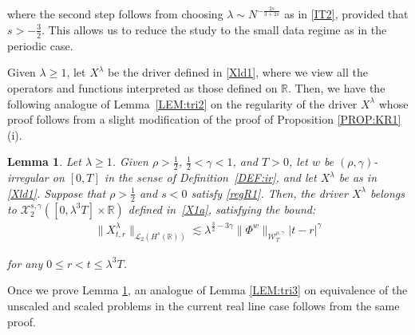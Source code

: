 \documentclass[letterpaper, 11pt,  reqno]{amsart}
\newtheorem{lemma}[theorem]{Lemma}
\newcommand{\1}{\hspace{0.5mm}\text{I}\hspace{0.5mm}}
\newcommand{\noi}{\noindent}
\newcommand{\R}{\mathbb{R}}
\newcommand{\g}{\gamma}
\newcommand{\ld}{\lambda}
\newcommand{\les}{\lesssim}
\newcommand{\cL}{\mathcal{L}}
\newcommand{\cX}{\mathcal{X}}
\newcommand{\W}{\mathcal{W}}
\numberwithin{equation}{section}
\numberwithin{theorem}{section}
\begin{document}
\noi
where the second step 
follows from choosing 
$\ld \sim N^{-\frac{2s}{3+2s}}$ as in \eqref{IT2}, 
provided that $s > -\frac 32$.
This allows us to reduce the study to the small data regime
as in the periodic case.




Given $\ld \ge 1$, let $X^\ld$ be the driver defined in \eqref{Xld1}, 
where we view all the operators and functions 
interpreted as those defined on $\R$.
Then, we have the following 
analogue of Lemma~\ref{LEM:tri2}
on the regularity of the driver $X^\ld$ 
whose proof follows
from a slight modification of the proof of 
Proposition \ref{PROP:KR1}\,(i).


\begin{lemma}
\label{LEM:Rtri2}
Let $\ld \ge 1$.
Given $\rho > \frac 12$, $\frac 12 < \g < 1$, and $T> 0$, 
let  $w$ be $(\rho,\g)$-irregular on $[0, T]$ in the sense of Definition~\ref{DEF:ir}, 
and let $X^\ld$ be as in \eqref{Xld1}.
Suppose that $\rho > \frac 12$ and $s <  0$
satisfy 
\eqref{regR1}.
Then, 
the driver $X^\ld$ 
belongs to $  \cX^{s, \g}_2([0, \ld^3T] \times \R)$ defined in~\eqref{X1a}, 
satisfying the bound\textup{:}
 \begin{align*}
 \| X^{\ld}_{t,r}  \|_{\cL_2 ( H^s(\R)) }
 \les
 \ld^{ \frac32 -3\g} 
  \|\Phi^{w}\|_{\W_{T}^{\rho, \g}}
 |t-r|^{\g}
\end{align*}


\noi
for any $0\leq r<t \leq \ld^3T $.

\end{lemma}


Once we prove Lemma \ref{LEM:Rtri2}, 
an analogue of Lemma \ref{LEM:tri3} 
on  equivalence of the 
unscaled and scaled problems in the current real line case follows
from the same proof.
\end{document}

